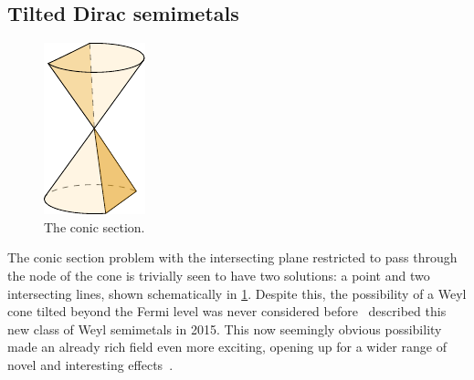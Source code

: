 \clearpage
\subsection{Tilted Dirac semimetals}
\label{sec:typeii}
\begin{figure}
  \centering
  \vspace{-2.4em}
  \includegraphics[width=.25\textwidth]{figures/conicSection}
  \setcapindent*{0pt}
  \caption{The conic section. \label{fig:conic-section-sketch}}
\end{figure}
The conic section problem with the intersecting plane restricted to pass through the node of the cone is trivially seen to have two solutions: a point and two intersecting lines, shown schematically in \cref{fig:conic-section-sketch}.
Despite this, the possibility of a Weyl cone tilted beyond the Fermi level was never considered before~\textcite{soluyanovTypeIIWeylSemimetals2015} described this new class of Weyl semimetals in 2015.
This now seemingly obvious possibility made an already rich field even more exciting, opening up for a wider range of novel and interesting effects~\cite{soluyanovTypeIIWeylSemimetals2015,sharmaChiralAnomalyLongitudinal2017,yuPredictedUnusualMagnetoresponse2016,tchoumakovMagneticFieldInducedRelativisticProperties2016,ferreirosAnomalousNernstThermal2017}.


